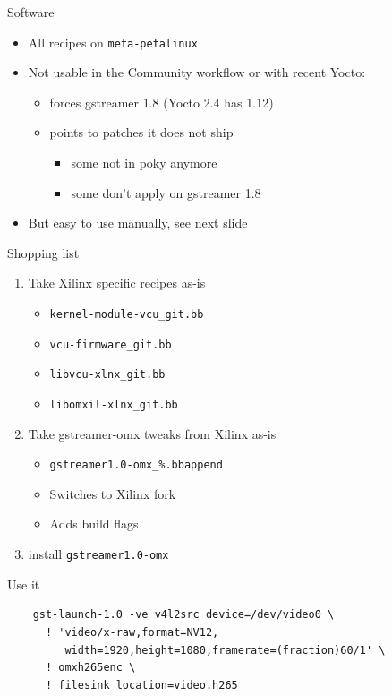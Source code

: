 \documentclass[xetex,table]{beamer}
\begin{document}
\begin{frame}{Software}
  \begin{itemize}
  \item All recipes on {\tt meta-petalinux}
  \item Not usable in the Community workflow or with recent Yocto:
    \begin{itemize}
    \item forces gstreamer 1.8 (Yocto 2.4 has 1.12)
    \item points to patches it does not ship
      \begin{itemize}
      \item some not in poky anymore
      \item some don't apply on gstreamer 1.8
      \end{itemize}
    \end{itemize}
  \item But easy to use manually, see next slide
  \end{itemize}
\end{frame}

\begin{frame}{Shopping list}
  \begin{enumerate}
  \item Take Xilinx specific recipes as-is
    \begin{itemize}
    \item {\tt kernel-module-vcu\_git.bb}
    \item {\tt vcu-firmware\_git.bb}
    \item {\tt libvcu-xlnx\_git.bb}
    \item {\tt libomxil-xlnx\_git.bb}
    \end{itemize}
  \item Take gstreamer-omx tweaks from Xilinx as-is
    \begin{itemize}
    \item {\tt gstreamer1.0-omx\_\%.bbappend}
    \item Switches to Xilinx fork
    \item Adds build flags
    \end{itemize}
  \item install {\tt gstreamer1.0-omx}
  \end{enumerate}
\end{frame}

\begin{frame}[fragile]{Use it}
  \begin{verbatim}
    gst-launch-1.0 -ve v4l2src device=/dev/video0 \
      ! 'video/x-raw,format=NV12,
         width=1920,height=1080,framerate=(fraction)60/1' \
      ! omxh265enc \
      ! filesink location=video.h265
  \end{verbatim}
\end{frame}
\end{document}
